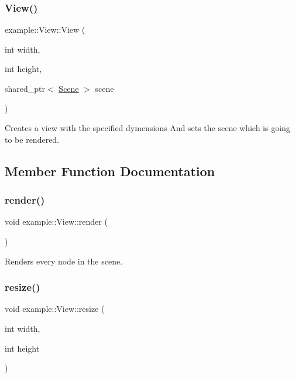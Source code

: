 \subsubsection{\texorpdfstring{View()}{View()}}
{\footnotesize\ttfamily example\+::\+View\+::\+View (\begin{DoxyParamCaption}\item[{int}]{width,  }\item[{int}]{height,  }\item[{shared\+\_\+ptr$<$ \mbox{\hyperlink{classoglsl_1_1_scene}{Scene}} $>$}]{scene }\end{DoxyParamCaption})}



Creates a view with the specified dymensions And sets the scene which is going to be rendered. 



\subsection{Member Function Documentation}
\mbox{\label{classoglsl_1_1_view_a10ea89fc705a2ba2252f673499524bf2}} 
\subsubsection{\texorpdfstring{render()}{render()}}
{\footnotesize\ttfamily void example\+::\+View\+::render (\begin{DoxyParamCaption}{ }\end{DoxyParamCaption})}



Renders every node in the scene. 

\mbox{\label{classoglsl_1_1_view_a2396337a1db393acefb174e386cde7d1}} 
\subsubsection{\texorpdfstring{resize()}{resize()}}
{\footnotesize\ttfamily void example\+::\+View\+::resize (\begin{DoxyParamCaption}\item[{int}]{width,  }\item[{int}]{height }\end{DoxyParamCaption})}



